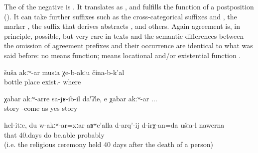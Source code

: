 The  of the negative  is . It translates as  ,  and fulfills the function of a postposition (). It can take further suffixes such as the cross-categorical suffixes  and , the  marker  , the suffix  that derives abstracts , and others. Again  agreement is, in principle, possible, but very rare in texts  and the semantic differences between the omission of agreement prefixes and their occurrence are identical to what was said before: no   means  function;   means locational and/or existential function .
%
\begin{exe}
	\ex	\label{ex:There is no place without bottles}
	\gll	šuša	akːʷ-ar	musːa	χe-b-akːu	čina-b-k'al\\
		bottle		place	exist.-	where\\
	\glt	{}

	\ex	\label{ex:as if his arrival was unexpected (lit. without news), yes unexpected}
	\gll	χabar	akːʷ-arre	sa-jʁ-ib-il	daˁʡle,		e	χabar	akːʷ-ar ...\\
		story		-come	as	yes	story	\\
	\glt	{}

	\ex	\label{ex:Well, you like this, even me not being there, should be able to do the 40 days, probably}
	\gll	hel-itːe,	du	w-akːʷ-ar=xːar	aʁʷc'alla	d-arq'-ij	d-irχ-an=da	ušːa-l		nawerna\\
		that			40.days	do	be.able			probably\\
	\glt	{} (i.e. the religious ceremony held 40 days after the death of a person)
\end{exe}

